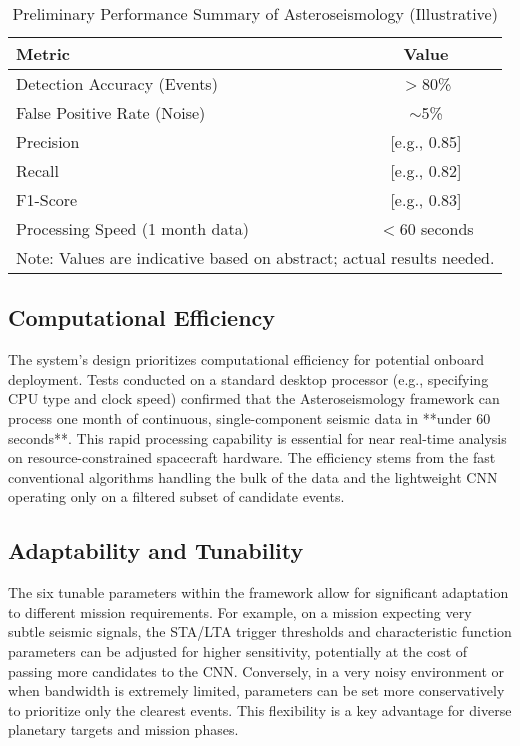 \documentclass[conference]{IEEEtran}
\begin{document}
\begin{table}[htbp]
\caption{Preliminary Performance Summary of Asteroseismology (Illustrative)}
\begin{center}
\begin{tabular}{|l|c|}
\hline
\textbf{Metric} & \textbf{Value} \\
\hline
Detection Accuracy (Events) & $>$80\% \\
False Positive Rate (Noise) & $\sim$5\% \\
Precision & [e.g., 0.85] \\
Recall & [e.g., 0.82] \\
F1-Score & [e.g., 0.83] \\
Processing Speed (1 month data) & $<$60 seconds \\
\hline
\multicolumn{2}{l}{Note: Values are indicative based on abstract; actual results needed.}
\end{tabular}
\label{tab:performance_summary}
\end{center}
\end{table}


\subsection{Computational Efficiency}
The system's design prioritizes computational efficiency for potential onboard deployment. Tests conducted on a standard desktop processor (e.g., specifying CPU type and clock speed) confirmed that the Asteroseismology framework can process one month of continuous, single-component seismic data in **under 60 seconds**. This rapid processing capability is essential for near real-time analysis on resource-constrained spacecraft hardware. The efficiency stems from the fast conventional algorithms handling the bulk of the data and the lightweight CNN operating only on a filtered subset of candidate events.

\subsection{Adaptability and Tunability}
The six tunable parameters within the framework allow for significant adaptation to different mission requirements. For example, on a mission expecting very subtle seismic signals, the STA/LTA trigger thresholds and characteristic function parameters can be adjusted for higher sensitivity, potentially at the cost of passing more candidates to the CNN. Conversely, in a very noisy environment or when bandwidth is extremely limited, parameters can be set more conservatively to prioritize only the clearest events. This flexibility is a key advantage for diverse planetary targets and mission phases.
\end{document}
